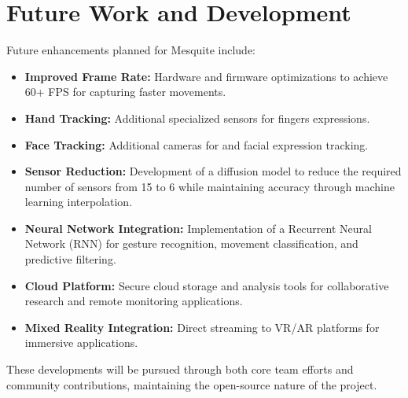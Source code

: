 \documentclass[lettersize,journal]{IEEEtran}
\begin{document}
\section {Future Work and Development}

Future enhancements planned for Mesquite include:
\begin{itemize}
  \item \textbf{Improved Frame Rate:} Hardware and firmware optimizations to achieve 60+ FPS for capturing faster movements.
  \item \textbf{Hand Tracking:} Additional specialized sensors for fingers expressions.  
  \item \textbf{Face Tracking:} Additional cameras for and facial expression tracking.
  \item \textbf{Sensor Reduction:} Development of a diffusion model to reduce the required number of sensors from 15 to 6 while maintaining accuracy through machine learning interpolation.
  \item \textbf{Neural Network Integration:} Implementation of a Recurrent Neural Network (RNN) for gesture recognition, movement classification, and predictive filtering.
  \item \textbf{Cloud Platform:} Secure cloud storage and analysis tools for collaborative research and remote monitoring applications.
  \item \textbf{Mixed Reality Integration:} Direct streaming to VR/AR platforms for immersive applications.
\end{itemize}

These developments will be pursued through both core team efforts and community contributions, maintaining the open-source nature of the project.
\end{document}
